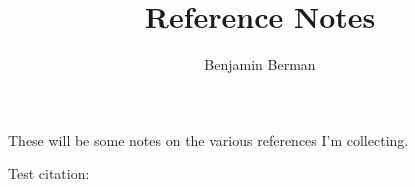 \documentclass[11pt]{amsart}
\title{Reference Notes}
\author{Benjamin Berman}
\begin{document}
\maketitle

These will be some notes on the various references I'm collecting.

Test citation: \citep{Anderson92}



\end{document}
